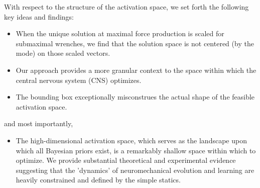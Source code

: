 With respect to the structure of the activation space, we set forth the following key ideas and findings:
\begin{itemize}
\item {When the unique solution at maximal force production is scaled for submaximal wrenches, we find that the solution space is not centered (by the mode) on those scaled vectors.}
\item {Our approach provides a more granular context to the space within which the central nervous system (CNS) optimizes.}
\item {The bounding box exceptionally misconstrues the actual shape of the feasible activation space.}
\end{itemize}
and most importantly,
\begin{itemize}
\item {The high-dimensional activation space, which serves as the landscape upon which all Bayesian priors exist, is a remarkably shallow space within which to optimize. We provide substantial theoretical and experimental evidence suggesting that the 'dynamics' of neuromechanical evolution and learning are heavily constrained and defined by the simple statics.}
\end{itemize}

